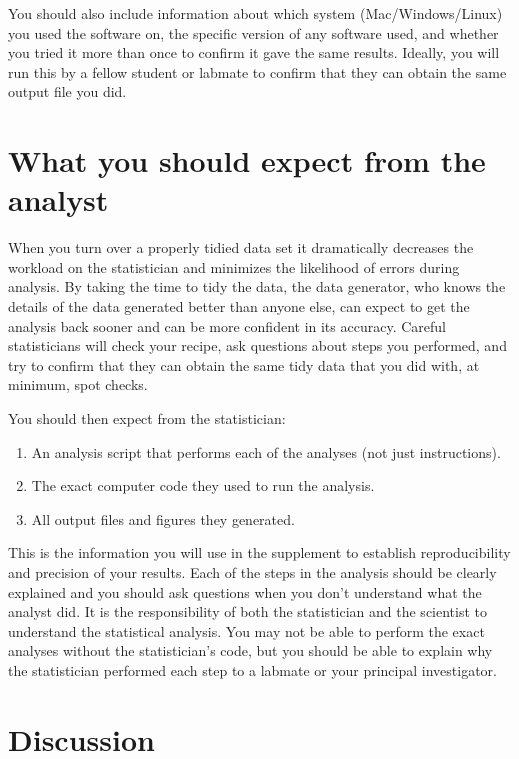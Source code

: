 \documentclass[12pt]{article}
\providecommand{\tightlist}{%
  \setlength{\itemsep}{0pt}\setlength{\parskip}{0pt}}
\begin{document}
You should also include information about which system
(Mac/Windows/Linux) you used the software on, the specific version of
any software used, and whether you tried it more than once to confirm it
gave the same results. Ideally, you will run this by a fellow student or
labmate to confirm that they can obtain the same output file you did.

\section{What you should expect from the
analyst}\label{what-you-should-expect-from-the-analyst}

When you turn over a properly tidied data set it dramatically decreases
the workload on the statistician and minimizes the likelihood of errors
during analysis. By taking the time to tidy the data, the data
generator, who knows the details of the data generated better than
anyone else, can expect to get the analysis back sooner and can be more
confident in its accuracy. Careful statisticians will check your recipe,
ask questions about steps you performed, and try to confirm that they
can obtain the same tidy data that you did with, at minimum, spot
checks.

You should then expect from the statistician:

\begin{enumerate}
\def\labelenumi{\arabic{enumi}.}
\tightlist
\item
  An analysis script that performs each of the analyses (not just
  instructions).
\item
  The exact computer code they used to run the analysis.
\item
  All output files and figures they generated.
\end{enumerate}

This is the information you will use in the supplement to establish
reproducibility and precision of your results. Each of the steps in the
analysis should be clearly explained and you should ask questions when
you don't understand what the analyst did. It is the responsibility of
both the statistician and the scientist to understand the statistical
analysis. You may not be able to perform the exact analyses without the
statistician's code, but you should be able to explain why the
statistician performed each step to a labmate or your principal
investigator.

\section{Discussion}\label{discussion}
\end{document}
